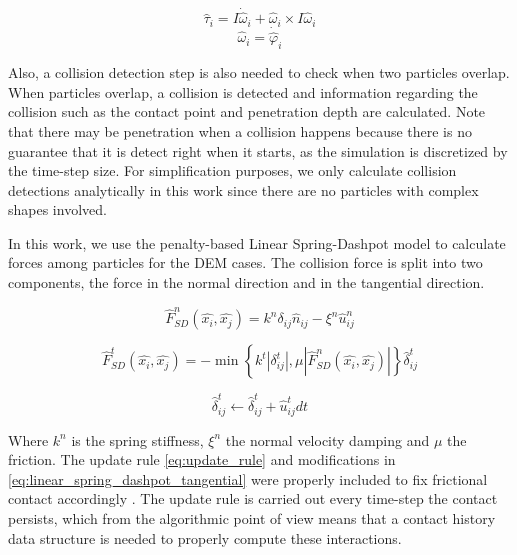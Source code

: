 \documentclass[preprint,12pt]{elsarticle}
\begin{document}
\begin{equation}
    \hat{\tau}{_i} = I \dot{\hat \omega}_i + {\hat \omega}_i \times I {\hat \omega}_i \label{eq:newton_torque}
\end{equation}
\begin{equation}
    \hat{\omega}{_i} = \dot{\hat{\varphi}}_i \label{eq:newton_angular_velocity}
\end{equation}

Also, a collision detection step is also needed to check when two particles overlap.
When particles overlap, a collision is detected and information regarding the collision such as the contact point and penetration depth are calculated.
Note that there may be penetration when a collision happens because there is no guarantee that it is detect right when it starts, as the simulation is discretized by the time-step size.
For simplification purposes, we only calculate collision detections analytically in this work since there are no particles with complex shapes involved.

In this work, we use the penalty-based Linear Spring-Dashpot model to calculate forces among particles for the DEM cases.
The collision force is split into two components, the force in the normal direction and in the tangential direction.

\begin{equation}
    \hat{F}_{SD}^{n}(\hat{x_i}, \hat{x_j}) = k^{n}\delta_{ij}\hat{n}_{ij} - \xi^{n}\hat{u}_{ij}^{n}
    \label{eq:linear_spring_dashpot_normal}
\end{equation}

\begin{equation}
    \hat{F}_{SD}^{t}(\hat{x_i}, \hat{x_j}) = -\min \left\{ k^{t}\left| \delta^{t}_{ij} \right|,\mu\left|\hat{F}_{SD}^{n}(\hat{x_i}, \hat{x_j}) \right| \right\} \hat{\delta}^{t}_{ij}
    \label{eq:linear_spring_dashpot_tangential}
\end{equation}

\begin{equation}
    \hat{\delta}^{t}_{ij} \gets \hat{\delta}^{t}_{ij} + \hat{u}_{ij}^{t}dt
    \label{eq:update_rule}
\end{equation}

Where $k^{n}$ is the spring stiffness, $\xi^{n}$ the normal velocity damping and $\mu$ the friction.
The update rule \autoref{eq:update_rule} and modifications in \autoref{eq:linear_spring_dashpot_tangential} were properly included to fix frictional contact accordingly \cite{dem1,dem2}.
The update rule is carried out every time-step the contact persists, which from the algorithmic point of view means that a contact history data structure is needed to properly compute these interactions.
\end{document}
